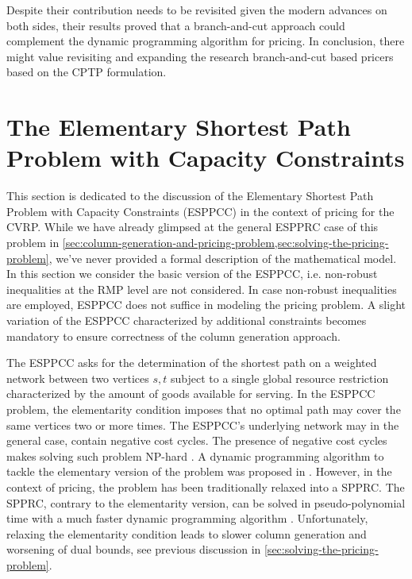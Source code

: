 Despite their contribution needs to be revisited given the modern advances on both sides,
their results proved that a branch-and-cut approach could complement
the dynamic programming algorithm for pricing.
In conclusion, there might value revisiting and
expanding the research branch-and-cut based pricers based on the CPTP formulation.

\section{The Elementary Shortest Path Problem with Capacity Constraints}
\label{sec:the-elementary-shortest-path-problem-with-capacity-constraints}

This section is dedicated to the discussion of the
Elementary Shortest Path Problem with Capacity Constraints (ESPPCC)
in the context of pricing for the CVRP.
While we have already glimpsed at the general ESPPRC case of this problem in
\cref{sec:column-generation-and-pricing-problem,sec:solving-the-pricing-problem},
we've never provided a formal description of the mathematical model.
In this section we consider the basic version of the ESPPCC,
i.e. non-robust inequalities at the RMP level are not considered.
In case non-robust inequalities are employed,
ESPPCC does not suffice in modeling the pricing problem.
A slight variation of the ESPPCC characterized by additional constraints
becomes mandatory to ensure correctness of the column generation approach.

The ESPPCC asks for the determination of the shortest path on a weighted network
between two vertices $s, t$
subject to a single global resource restriction characterized
by the amount of goods available for serving.
In the ESPPCC problem,
the elementarity condition imposes that no optimal path may
cover the same vertices two or more times.
The ESPPCC's underlying network may in the general case,
contain negative cost cycles.
The presence of negative cost cycles makes solving such problem NP-hard \parencite{dror1994}.
A dynamic programming algorithm
to tackle the elementary version of the problem
was proposed in \textcite{feillet2004}.
However, in the context of pricing, the problem has been traditionally relaxed into a SPPRC.
The SPPRC,
contrary to the elementarity version,
can be solved in pseudo-polynomial time with a much faster dynamic programming algorithm \parencite{desrochers1992}.
Unfortunately,
relaxing the elementarity condition leads to slower column generation and worsening of dual bounds,
see previous discussion in \cref{sec:solving-the-pricing-problem}.

